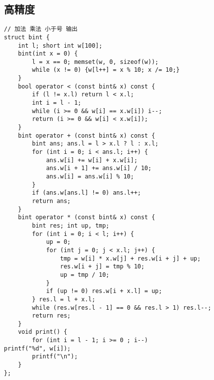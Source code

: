 \documentclass[a4paper]{article}
\begin{document}
\subsection{高精度}
\begin{lstlisting}
// 加法 乘法 小于号 输出
struct bint {
	int l; short int w[100];
	bint(int x = 0) {
		l = x == 0; memset(w, 0, sizeof(w));
		while (x != 0) {w[l++] = x % 10; x /= 10;}
	}
	bool operator < (const bint& x) const {
		if (l != x.l) return l < x.l;
		int i = l - 1;
		while (i >= 0 && w[i] == x.w[i]) i--;
		return (i >= 0 && w[i] < x.w[i]);
	}
	bint operator + (const bint& x) const {
		bint ans; ans.l = l > x.l ? l : x.l;
		for (int i = 0; i < ans.l; i++) {
			ans.w[i] += w[i] + x.w[i];
			ans.w[i + 1] += ans.w[i] / 10;
			ans.w[i] = ans.w[i] % 10;
		}
		if (ans.w[ans.l] != 0) ans.l++;
		return ans;
	}
	bint operator * (const bint& x) const {
		bint res; int up, tmp;
		for (int i = 0; i < l; i++) {
			up = 0;
			for (int j = 0; j < x.l; j++) {
				tmp = w[i] * x.w[j] + res.w[i + j] + up;
				res.w[i + j] = tmp % 10;
				up = tmp / 10;
			}
			if (up != 0) res.w[i + x.l] = up;
		} res.l = l + x.l;
		while (res.w[res.l - 1] == 0 && res.l > 1) res.l--;
		return res;
	}
	void print() {
		for (int i = l - 1; i >= 0 ; i--)
printf("%d", w[i]);
		printf("\n");
	}
};
\end{lstlisting}
\end{document}
